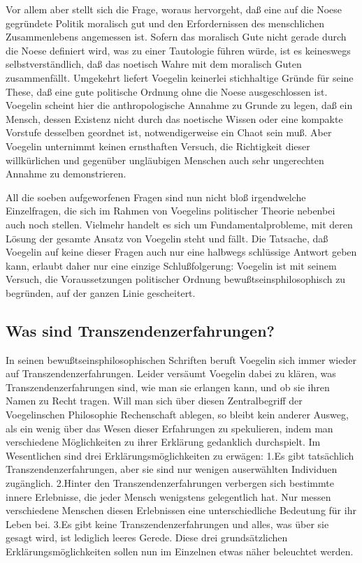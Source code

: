 Vor allem aber stellt sich die Frage, woraus hervorgeht, daß eine auf
die Noese gegründete Politik moralisch gut und den Erfordernissen des
menschlichen Zusammenlebens angemessen ist. Sofern das moralisch Gute
nicht gerade durch die Noese definiert wird, was zu einer Tautologie
führen würde, ist es keineswegs selbstverständlich, daß das noetisch
Wahre mit dem moralisch Guten zusammenfällt. Umgekehrt liefert Voegelin
keinerlei stichhaltige Gründe für seine These, daß eine gute politische
Ordnung ohne die Noese ausgeschlossen ist. Voegelin scheint hier die
anthropologische Annahme zu Grunde zu legen, daß ein Mensch, dessen
Existenz nicht durch das noetische Wissen oder eine kompakte Vorstufe
desselben geordnet ist, notwendigerweise ein Chaot sein muß.  Aber
Voegelin unternimmt keinen ernsthaften Versuch, die Richtigkeit dieser
willkürlichen und gegenüber ungläubigen Menschen auch sehr ungerechten
Annahme zu demonstrieren.

All die soeben aufgeworfenen Fragen sind nun nicht bloß irgendwelche
Einzelfragen, die sich im Rahmen von Voegelins politischer Theorie nebenbei
auch noch stellen. Vielmehr handelt es sich um Fundamentalprobleme, mit deren
Lösung der gesamte Ansatz von Voegelin steht und fällt. Die Tatsache, daß
Voegelin auf keine dieser Fragen auch nur eine halbwegs schlüssige Antwort
geben kann, erlaubt daher nur eine einzige Schlußfolgerung: Voegelin ist mit
seinem Versuch, die Voraussetzungen politischer Ordnung
bewußtseinsphilosophisch zu begründen, auf der ganzen Linie gescheitert.

\subsection{Was sind Transzendenzerfahrungen?}

In seinen bewußtseinsphilosophischen Schriften beruft Voegelin sich immer
wieder auf Transzendenzerfahrungen. Leider versäumt Voegelin dabei zu klären,
was Transzendenzerfahrungen sind, wie man sie erlangen kann, und ob sie ihren
Namen zu Recht tragen. Will man sich über diesen Zentralbegriff der
Voegelinschen Philosophie Rechenschaft ablegen, so bleibt kein anderer Ausweg,
als ein wenig über das Wesen dieser Erfahrungen zu spekulieren, indem man
verschiedene Möglichkeiten zu ihrer Erklärung gedanklich durchspielt. Im
Wesentlichen sind drei Erklärungsmöglichkeiten zu erwägen: 1.Es gibt
tatsächlich Transzendenzerfahrungen, aber sie sind nur wenigen auserwählten
Individuen zugänglich. 2.Hinter den Transzendenzerfahrungen verbergen sich
bestimmte innere Erlebnisse, die jeder Mensch wenigstens gelegentlich hat. Nur
messen verschiedene Menschen diesen Erlebnissen eine unterschiedliche
Bedeutung für ihr Leben bei. 3.Es gibt keine Transzendenzerfahrungen und
alles, was über sie gesagt wird, ist lediglich leeres Gerede. Diese drei
grundsätzlichen Erklärungsmöglichkeiten sollen nun im Einzelnen etwas näher
beleuchtet werden.

